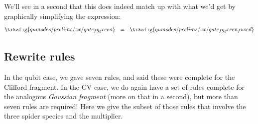 We'll see in a second that this does indeed match up with what we'd get by graphically simplifying the expression:
\begin{equation}
    \tikzfig{qumodes/prelims/zx/gate_fg_green}
    ~~=~~
    \tikzfig{qumodes/prelims/zx/gate_fg_green_fused}
\end{equation}

\subsection{Rewrite rules}

In the qubit case, we gave seven rules, and said these were complete for the Clifford fragment.
In the CV case, we do again have a set of rules complete for the analogous \textit{Gaussian fragment} (more on that in a second), but more than seven rules are required!
Here we give the subset of those rules that involve the three spider species and the multiplier.

